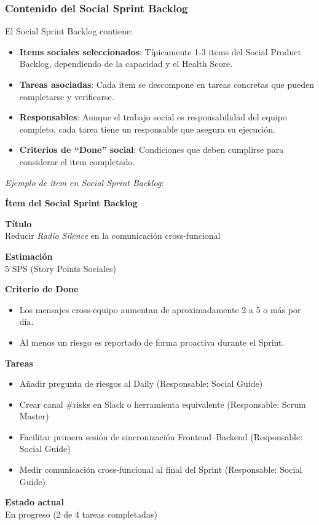 \subsubsection{Contenido del Social Sprint Backlog}
El Social Sprint Backlog contiene:

\begin{itemize}
    \item \textbf{Items sociales seleccionados}: Típicamente 1-3 items del Social Product Backlog, dependiendo de la capacidad y el Health Score.
    \item \textbf{Tareas asociadas}: Cada item se descompone en tareas concretas que pueden completarse y verificarse.
    \item \textbf{Responsables}: Aunque el trabajo social es responsabilidad del equipo completo, cada tarea tiene un responsable que asegura su ejecución.
    \item \textbf{Criterios de ``Done'' social}: Condiciones que deben cumplirse para considerar el item completado.
\end{itemize}

\textit{Ejemplo de item en Social Sprint Backlog}:

\begin{protocolo}
    \textbf{Ítem del Social Sprint Backlog}

    \textbf{Título}\\
    Reducir \emph{Radio Silence} en la comunicación cross-funcional

    \medskip
    \textbf{Estimación}\\
    5 SPS (Story Points Sociales)

    \medskip
    \textbf{Criterio de Done}
    \begin{itemize}
        \item Los mensajes cross-equipo aumentan de aproximadamente 2 a 5 o más por día.
        \item Al menos un riesgo es reportado de forma proactiva durante el Sprint.
    \end{itemize}

    \medskip
    \textbf{Tareas}
    \begin{itemize}
        \item Añadir pregunta de riesgos al Daily \hfill (Responsable: Social Guide)
        \item Crear canal \#risks en Slack o herramienta equivalente \hfill (Responsable: Scrum Master)
        \item Facilitar primera sesión de sincronización Frontend–Backend \hfill (Responsable: Social Guide)
        \item Medir comunicación cross-funcional al final del Sprint \hfill (Responsable: Social Guide)
    \end{itemize}

    \medskip
    \textbf{Estado actual}\\
    En progreso (2 de 4 tareas completadas)

\end{protocolo}

